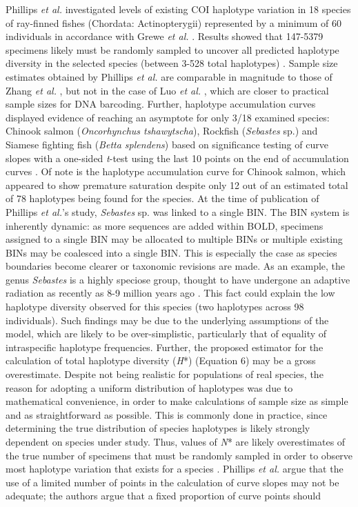 Phillips \textit{et al.} \cite{phillips2015exploration} investigated levels of existing COI haplotype variation in 18 species of ray-finned fishes (Chordata: Actinopterygii) represented by a minimum of 60 individuals in accordance with Grewe \textit{et al.} \cite{grewe1993mitochondrial}. Results showed that 147-5379 specimens likely must be randomly sampled to uncover all predicted haplotype diversity in the selected species (between 3-528 total haplotypes) \cite{phillips2015exploration}. Sample size estimates obtained by Phillips \textit{et al.} \cite{phillips2015exploration} are comparable in magnitude to those of Zhang \textit{et al.} \cite{zhang2010estimating}, but not in the case of Luo \textit{et al.} \cite{luo2015simulation}, which are closer to practical sample sizes for DNA barcoding. Further, haplotype accumulation curves displayed evidence of reaching an asymptote for only 3/18 examined species: Chinook salmon (\textit{Oncorhynchus tshawytscha}), Rockfish (\textit{Sebastes} sp.) and Siamese fighting fish (\textit{Betta splendens}) based on significance testing of curve slopes with a one-sided \textit{t}-test using the last 10 points on the end of accumulation curves \cite{phillips2015exploration}. Of note is the haplotype accumulation curve for Chinook salmon, which appeared to show premature saturation despite only 12 out of an estimated total of 78 haplotypes being found for the species. At the time of publication of Phillips \textit{et al.}'s \cite{phillips2015exploration} study, \textit{Sebastes} sp. was linked to a single BIN. The BIN system is inherently dynamic: as more sequences are added within BOLD, specimens assigned to a single BIN may be allocated to multiple BINs or multiple existing BINs may be coalesced into a single BIN. This is especially the case as species boundaries become clearer or taxonomic revisions are made. As an example, the genus \textit{Sebastes} is a highly speciose group, thought to have undergone an adaptive radiation as recently as 8-9 million years ago \cite{steinke2009dna}. This fact could explain the low haplotype diversity observed for this species (two haplotypes across 98 individuals). Such findings may be due to the underlying assumptions of the model, which are likely to be over-simplistic, particularly that of equality of intraspecific haplotype frequencies. Further, the proposed estimator for the calculation of total haplotype diversity (\textit{H}*) (Equation 6) may be a gross overestimate. Despite not being realistic for populations of real species, the reason for adopting a uniform distribution of haplotypes was due to mathematical convenience, in order to make calculations of sample size as simple and as straightforward as possible. This is commonly done in practice, since determining the true distribution of species haplotypes is likely strongly dependent on species under study. Thus, values of \textit{N}* are likely overestimates of the true number of specimens that must be randomly sampled in order to observe most haplotype variation that exists for a species \cite{phillips2015exploration}. Phillips \textit{et al.} \cite{phillips2015exploration} argue that the use of a limited number of points in the calculation of curve slopes may not be adequate; the authors argue that a fixed proportion of curve points should 